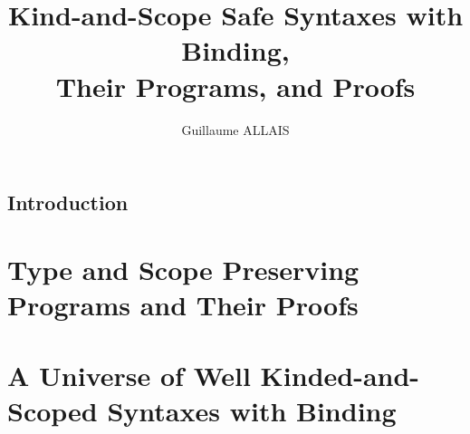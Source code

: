 \documentclass{memoir}
\title{Kind-and-Scope Safe Syntaxes with Binding, \\ Their Programs, and Proofs}
\author{Guillaume ALLAIS}
\begin{document}
\maketitle{}

\chapter{Introduction}

\label{introduction-agda}


\part{Type and Scope Preserving Programs and Their Proofs}
\label{type-scope-semantics}


\part{A Universe of Well Kinded-and-Scoped Syntaxes with Binding}
\label{a-universe}



\end{document}
